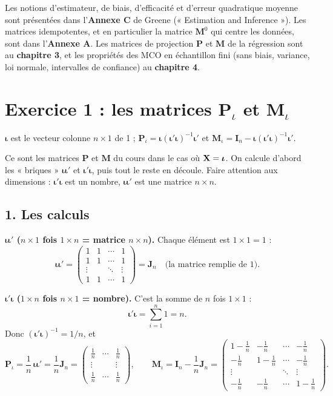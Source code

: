 \documentclass[11pt,a4paper]{article}
\newcommand{\vi}{\bm{\iota}}
\newcommand{\I}{\mathbf{I}}\newcommand{\J}{\mathbf{J}}
\newcommand{\Pm}{\mathbf{P}}\newcommand{\Mm}{\mathbf{M}}
\newcommand{\sumi}{\sum_{i=1}^{n}}
\begin{document}
\begin{greene}
Les notions d'estimateur, de biais, d'efficacité et d'erreur quadratique moyenne sont présentées dans l'\textbf{Annexe C} de Greene (« Estimation and Inference »). Les matrices idempotentes, et en particulier la matrice $\Mm^0$ qui centre les données, sont dans l'\textbf{Annexe A}. Les matrices de projection $\Pm$ et $\Mm$ de la régression sont au \textbf{chapitre 3}, et les propriétés des MCO en échantillon fini (sans biais, variance, loi normale, intervalles de confiance) au \textbf{chapitre 4}.
\end{greene}

\section{Exercice 1 : les matrices $\Pm_\iota$ et $\Mm_\iota$}

$\vi$ est le vecteur colonne $n\times 1$ de 1 ; $\Pm_\iota=\vi(\vi'\vi)^{-1}\vi'$ et $\Mm_\iota=\I_n-\vi(\vi'\vi)^{-1}\vi'$.

\begin{idee}
Ce sont les matrices $\Pm$ et $\Mm$ du cours dans le cas où $\vX=\vi$. On calcule d'abord les « briques » $\vi\vi'$ et $\vi'\vi$, puis tout le reste en découle. Faire attention aux dimensions : $\vi'\vi$ est un nombre, $\vi\vi'$ est une matrice $n\times n$.
\end{idee}

\subsection*{1. Les calculs}

\textbf{$\vi\vi'$ ($n\times1$ fois $1\times n$ = matrice $n\times n$).} Chaque élément est $1\times1=1$ :
\[
\vi\vi'=\begin{pmatrix}1&1&\cdots&1\\1&1&\cdots&1\\\vdots&&\ddots&\vdots\\1&1&\cdots&1\end{pmatrix}=\J_n\quad\text{(la matrice remplie de 1)}.
\]

\textbf{$\vi'\vi$ ($1\times n$ fois $n\times1$ = nombre).} C'est la somme de $n$ fois $1\times1$ :
\[
\vi'\vi=\sumi 1=n .
\]
Donc $(\vi'\vi)^{-1}=1/n$, et
\[
\Pm_\iota=\frac1n\,\vi\vi'=\frac1n\J_n=\begin{pmatrix}\frac1n&\cdots&\frac1n\\\vdots&&\vdots\\\frac1n&\cdots&\frac1n\end{pmatrix},
\qquad
\Mm_\iota=\I_n-\frac1n\J_n=\begin{pmatrix}1-\frac1n&-\frac1n&\cdots&-\frac1n\\-\frac1n&1-\frac1n&\cdots&-\frac1n\\\vdots&&\ddots&\vdots\\-\frac1n&-\frac1n&\cdots&1-\frac1n\end{pmatrix}.
\]
\end{document}
